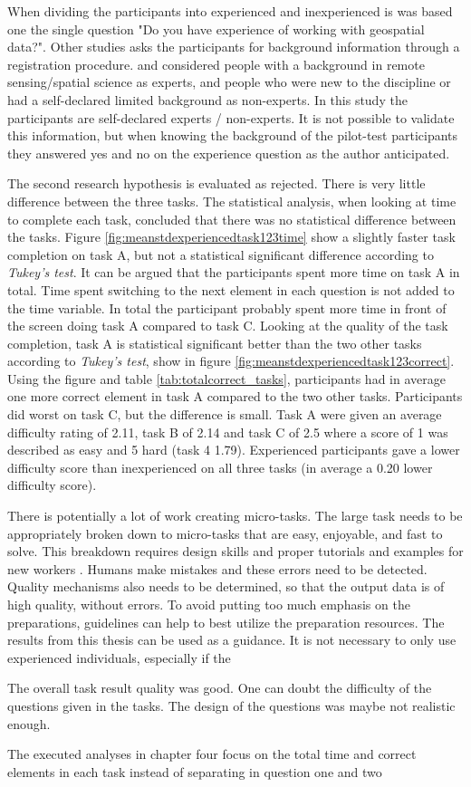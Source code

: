 When dividing the participants into experienced and inexperienced is was based one the single question "Do you have experience of working with geospatial data?". Other studies asks the participants for background information through a registration procedure. \cite{See2013} and \cite{Salk2016} considered people with a background in remote sensing/spatial science as experts, and people who were new to the discipline or had a self-declared limited background as non-experts. In this study the participants are self-declared experts / non-experts. It is not possible to validate this information, but when knowing the background of the pilot-test participants they answered yes and no on the experience question as the author anticipated. 

The second research hypothesis is evaluated as rejected. There is very little difference between the three tasks. The statistical analysis, when looking at time to complete each task, concluded that there was no statistical difference between the tasks. Figure \ref{fig:meanstdexperiencedtask123time} show a slightly faster task completion on task A, but not a statistical significant difference according to \textit{Tukey's test}. It can be argued that the participants spent more time on task A in total. Time spent switching to the next element in each question is not added to the time variable. In total the participant probably spent more time in front of the screen doing task A compared to task C. Looking at the quality of the task completion, task A is statistical significant better than the two other tasks according to \textit{Tukey's test}, show in figure \ref{fig:meanstdexperiencedtask123correct}. Using the figure and table \ref{tab:totalcorrect_tasks}, participants had in average one more correct element in task A compared to the two other tasks. Participants did worst on task C, but the difference is small. Task A were given an average difficulty rating of 2.11, task B of 2.14 and task C of 2.5  where a score of 1 was described as easy and 5 hard (task 4 1.79). Experienced participants gave a lower difficulty score than inexperienced on all three tasks (in average a 0.20 lower difficulty score).

There is potentially a lot of work creating micro-tasks. The large task needs to be appropriately broken down to micro-tasks that are easy, enjoyable, and fast to solve. This breakdown requires design skills and proper tutorials and examples for new workers \citep{Schulze2012}. Humans make mistakes and these errors need to be detected. Quality mechanisms also needs to be determined, so that the output data is of high quality, without errors. To avoid putting too much emphasis on the preparations, guidelines can help to best utilize the preparation resources. The results from this thesis can be used as a guidance. It is not necessary to only use experienced individuals, especially if the 

The overall task result quality was good. One can doubt the difficulty of the questions given in the tasks. The design of the questions was maybe not realistic enough. 

The executed analyses in chapter four focus on the total time and correct elements in each task instead of separating in question one and two 